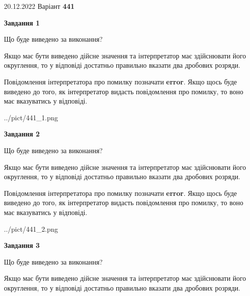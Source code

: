 \documentclass[12pt, ukrainian]{article}
\begin{document}
{20.12.2022 Варіант \No \textbf { 441 }\par}
{
\begin {Large}

{\begin {center}\textbf{Завдання 1}\end {center}}\par
Що буде виведено за виконання? \par

Якщо має бути виведено дійсне значення та інтерпретатор має здійснювати його округлення, 
то у відповіді достатньо правильно вказати два дробових розряди.

Повідомлення інтерпретатора про помилку позначати \textbf{error}.
Якщо щось буде виведено до того, як інтерпретатор видасть повідомлення про помилку, 
то воно має вказуватись у відповіді. \par

\begin{center}
	{../pict/441_1.png}
\end{center}
\newpage

{\begin {center}\textbf{Завдання 2}\end {center}}\par
Що буде виведено за виконання? \par

Якщо має бути виведено дійсне значення та інтерпретатор має здійснювати його округлення, 
то у відповіді достатньо правильно вказати два дробових розряди.

Повідомлення інтерпретатора про помилку позначати \textbf{error}.
Якщо щось буде виведено до того, як інтерпретатор видасть повідомлення про помилку, 
то воно має вказуватись у відповіді. \par

\begin{center}
	{../pict/441_2.png}
\end{center}
\newpage

{\begin {center}\textbf{Завдання 3}\end {center}}\par
Що буде виведено за виконання? \par

Якщо має бути виведено дійсне значення та інтерпретатор має здійснювати його округлення, 
то у відповіді достатньо правильно вказати два дробових розряди.


\end{Large}}
\end{document}
